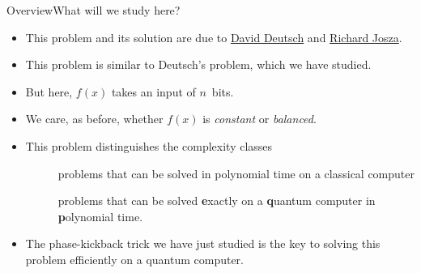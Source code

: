 
\begin{frame}{Overview}{What will we study here?}

\begin{itemize}[<+->]
    \item This problem and its solution are due to
    \href{https://en.wikipedia.org/wiki/David_Deutsch}{David Deutsch} and \href{https://en.wikipedia.org/wiki/Richard_Jozsa}{Richard Josza}.
    \item This problem is similar to Deutsch's problem, which we have studied.
    \item But here, $f(x)$ takes an input of $n$~bits.
    \item We care, as before, whether $f(x)$ is \emph{constant} or \emph{balanced}.
    \item This problem distinguishes the complexity classes
    \begin{description}
        \item[\href{https://complexityzoo.net/Complexity_Zoo:P}{}] problems that can be solved in polynomial time on a classical computer
        \item[\href{https://complexityzoo.net/Complexity_Zoo:E\#eqp}{}] problems that can be solved \textbf{e}xactly on a \textbf{q}uantum computer in \textbf{p}olynomial time.
    \end{description}
    \item The phase-kickback trick we have just studied is the key to solving this problem efficiently on a quantum computer.
\end{itemize}
    
\end{frame}

